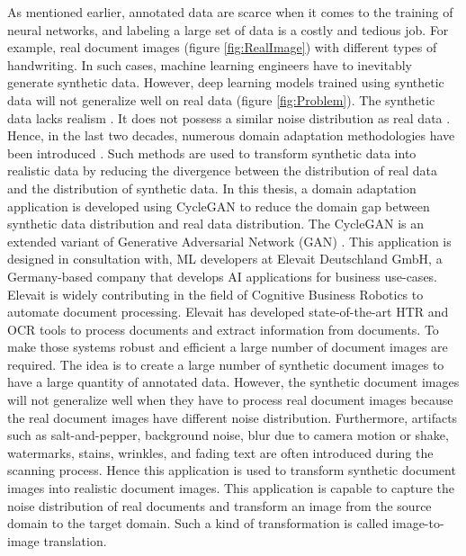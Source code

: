 As mentioned earlier, annotated data are scarce when it comes to the training of neural networks, and labeling a large set of data is a costly and tedious job. For example, real document images (figure \ref{fig:RealImage}) with different types of handwriting. In such cases, machine learning engineers have to inevitably generate synthetic data. However, deep learning models trained using synthetic data will not generalize well on real data \cite{8978087} (figure \ref{fig:Problem}). The synthetic data lacks realism \cite{8978087}. It does not possess a similar noise distribution as real data \cite{8978087}. Hence, in the last two decades, numerous domain adaptation methodologies have been introduced \cite{8978011}. Such methods are used to transform synthetic data into realistic data by reducing the divergence between the distribution of real data and the distribution of synthetic data. In this thesis, a domain adaptation application is developed using \ac{CycleGAN} \cite{zhu2020unpaired} to reduce the domain gap between synthetic data distribution and real data distribution. The \ac{CycleGAN} is an extended variant of Generative Adversarial Network (\ac{GAN}) \cite{goodfellow2014generative}. This application is designed in consultation with, \ac{ML} developers at Elevait Deutschland GmbH, a Germany-based company that develops \ac{AI} applications for business use-cases. Elevait is widely contributing in the field of Cognitive Business Robotics \cite{Metta2012} to automate document processing. Elevait has developed state-of-the-art \ac{HTR} and \ac{OCR} tools to process documents and extract information from documents. To make those systems robust and efficient a large number of document images are required. The idea is to create a large number of synthetic document images to have a large quantity of annotated data. However, the synthetic document images will not generalize well when they have to process real document images because the real document images have different noise distribution. Furthermore, artifacts such as salt-and-pepper, background noise, blur due to camera motion or shake, watermarks, stains, wrinkles, and fading text are often introduced during the scanning process. Hence this application is used to transform synthetic document images into realistic document images. This application is capable to capture the noise distribution of real documents and transform an image from the source domain to the target domain. Such a kind of transformation is called image-to-image translation.


